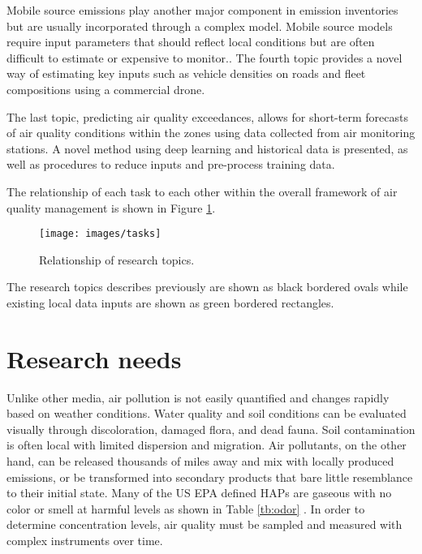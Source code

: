 Mobile source emissions play another major component in emission inventories but are usually incorporated through a complex model. Mobile source models require input parameters that should reflect local conditions but are often difficult to estimate or expensive to monitor.. The fourth topic provides a novel way of estimating key inputs such as vehicle densities on roads and fleet compositions using a commercial drone.

The last topic, predicting air quality exceedances, allows for short-term forecasts of air quality conditions within the zones using data collected from air monitoring stations. A novel method using deep learning and historical data is presented, as well as procedures to reduce inputs and pre-process training data. 

The relationship of each task to each other within the overall framework of air quality management is shown in Figure \ref{fig:tasks}.
%
\begin{figure}[H]
\centering
\texttt{[image: images/tasks]}  %
\caption{Relationship of research topics.}
\label{fig:tasks}
\end{figure}

The research topics describes previously are shown as black bordered ovals while existing local data inputs are shown as green bordered rectangles.
%

\section{Research needs}

Unlike other media,  air pollution is not easily quantified and changes rapidly based on weather conditions. Water quality and soil conditions can be evaluated visually through discoloration, damaged flora, and dead fauna. Soil contamination is often local with limited dispersion and migration. Air pollutants, on the other hand, can be released thousands of miles away and mix with locally produced emissions, or be transformed into secondary products that bare little resemblance to their initial state. Many of the US EPA defined HAPs are gaseous with no color or smell at harmful levels as shown in Table \ref{tb:odor} \citep{Murnane2013}. In order to determine concentration levels, air quality must be sampled and measured with complex instruments over time.

